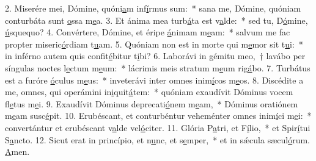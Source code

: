 2. Miserére mei, Dómine, quóni\uline{a}m inf\uline{í}rmus sum:~* sana me, Dómine, quóniam conturbáta sunt \uline{o}ssa m\uline{e}a.
3. Et ánima mea turb\uline{á}ta est v\uline{a}lde:~* sed tu, D\uline{ó}mine, \uline{ú}squequo?
4. Convértere, Dómine, et éripe \uline{á}nimam m\uline{e}am:~* salvum me fac propter miseric\uline{ó}rdiam t\uline{u}am.
5. Quóniam non est in morte qui m\uline{e}mor sit t\uline{u}i:~* in inférno autem quis confit\uline{é}bitur t\uline{i}bi?
6. Laborávi in gémitu meo,~† lavábo per síngulas noctes l\uline{e}ctum m\uline{e}um:~* lácrimis meis stratum m\uline{e}um rig\uline{á}bo.
7. Turbátus est a furóre \uline{ó}culus m\uline{e}us:~* inveterávi inter omnes inim\uline{í}cos m\uline{e}os.
8. Discédite a me, omnes, qui operámini in\uline{i}quit\uline{á}tem:~* quóniam exaudívit Dóminus vocem fl\uline{e}tus m\uline{e}i.
9. Exaudívit Dóminus deprecati\uline{ó}nem m\uline{e}am,~* Dóminus oratiónem m\uline{e}am susc\uline{é}pit.
10. Erubéscant, et conturbéntur veheménter omnes inim\uline{í}ci m\uline{e}i:~* convertántur et erubéscant v\uline{a}lde vel\uline{ó}citer.
11. Glória P\uline{a}tri, et F\uline{í}lio,~* et Spir\uline{í}tui S\uline{a}ncto.
12. Sicut erat in princípio, et n\uline{u}nc, et s\uline{e}mper,~* et in sǽcula sæcul\uline{ó}rum. \uline{A}men.
